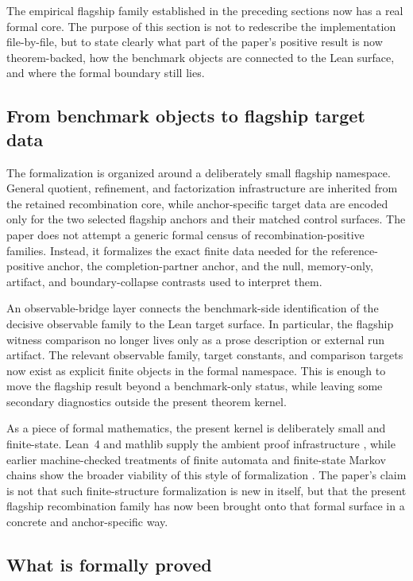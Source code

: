 \documentclass[11pt]{article}
\theoremstyle{definition}
\begin{document}
The empirical flagship family established in the preceding sections now has a real formal core. The purpose of this section is not to redescribe the implementation file-by-file, but to state clearly what part of the paper's positive result is now theorem-backed, how the benchmark objects are connected to the Lean surface, and where the formal boundary still lies.

\subsection{From benchmark objects to flagship target data}

The formalization is organized around a deliberately small flagship namespace. General quotient, refinement, and factorization infrastructure are inherited from the retained recombination core, while anchor-specific target data are encoded only for the two selected flagship anchors and their matched control surfaces. The paper does not attempt a generic formal census of recombination-positive families. Instead, it formalizes the exact finite data needed for the reference-positive anchor, the completion-partner anchor, and the null, memory-only, artifact, and boundary-collapse contrasts used to interpret them.

An observable-bridge layer connects the benchmark-side identification of the decisive observable family to the Lean target surface. In particular, the flagship witness comparison no longer lives only as a prose description or external run artifact. The relevant observable family, target constants, and comparison targets now exist as explicit finite objects in the formal namespace. This is enough to move the flagship result beyond a benchmark-only status, while leaving some secondary diagnostics outside the present theorem kernel.

As a piece of formal mathematics, the present kernel is deliberately small and finite-state. Lean~4 and mathlib supply the ambient proof infrastructure \cite{deMouraUllrich2021,MathlibCommunity2020}, while earlier machine-checked treatments of finite automata and finite-state Markov chains show the broader viability of this style of formalization \cite{Gonthier2008,Paulson2015,LiuHasanTahar2011}. The paper’s claim is not that such finite-structure formalization is new in itself, but that the present flagship recombination family has now been brought onto that formal surface in a concrete and anchor-specific way.

\subsection{What is formally proved}
\end{document}

